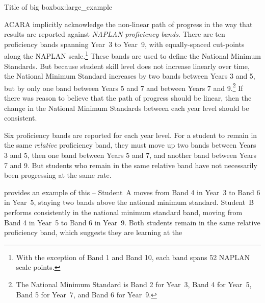 \begin{bigbox}{Title of big box}{box:large_example}

ACARA implicitly acknowledge the non-linear path of progress in the way that results are reported against \textit{NAPLAN proficiency bands}. There are ten proficiency bands spanning \mbox{Year 3} to \mbox{Year 9}, with equally-spaced cut-points along the NAPLAN scale.\footnote{With the exception of Band 1 and Band 10, each band spans 52 NAPLAN scale points.} These bands are used to define the National Minimum Standards. But because student skill level does not increase linearly over time, the National Minimum Standard increases by two bands between Years 3 and 5, but by only one band between Years 5 and 7 and between Years 7 and 9.\footnote{The National Minimum Standard is Band 2 for \mbox{Year 3}, Band 4 for \mbox{Year 5}, Band 5 for \mbox{Year 7}, and Band 6 for \mbox{Year 9}.} If there was reason to believe that the path of progress should be linear, then the change in the National Minimum Standards between each year level should be consistent.

Six proficiency bands are reported for each year level. For a student to remain in the same \textit{relative} proficiency band, they must move up two bands between Years 3 and 5, then one band between Years 5 and 7, and another band between Years 7 and 9. But students who remain in the same relative band have not necessarily been progressing at the same rate.

 provides an example of this -- Student~A moves from Band 4 in \mbox{Year 3} to Band 6 in \mbox{Year 5}, staying two bands above the national minimum standard. Student~B performs consistently in the national minimum standard band, moving from Band 4 in \mbox{Year 5} to Band 6 in \mbox{Year 9}. Both students remain in the same relative proficiency band, which suggests they are learning at the
\begin{figure}[H] %


\end{figure}
\end{bigbox}
